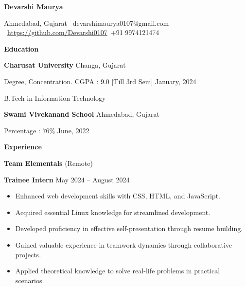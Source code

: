 \documentclass[11pt]{article}
\begin{document}
\begin{center}
    \textbf{Devarshi Maurya}\\ 
    \hrulefill
\end{center}

\begin{center}
    Ahmedabad, Gujarat \textbullet \ devarshimaurya0107@gmail.com \textbullet \  \url{https://github.com/Devarshi0107}\textbullet \ +91 9974121474
\end{center}

\vspace{0.5pt}

\begin{center}
    \textbf{Education}
\end{center}
\textbf{Charusat University} \hfill Changa, Gujarat

Degree, Concentration. CGPA : 9.0 [Till 3rd Sem] \hfill January, 2024

B.Tech in Information Technology

\vspace{12pt}

\textbf{Swami Vivekanand School} \hfill	Ahmedabad, Gujarat

Percentage : 76\%
\hfill June, 2022 

\vspace{12pt}

\begin{center}
    \textbf{Experience}
\end{center}
\textbf{Team Elementals} \hfill (Remote)

\textbf{Trainee Intern} \hfill May 2024 – August 2024
\begin{itemize}[noitemsep, topsep=0pt, partopsep=0pt, parsep=0pt]
   \item Enhanced web development skills with CSS, HTML, and JavaScript.
    \item Acquired essential Linux knowledge for streamlined development.
    \item Developed proficiency in effective self-presentation through resume building.
    \item Gained valuable experience in teamwork dynamics through collaborative projects.
    \item Applied theoretical knowledge to solve real-life problems in practical scenarios.
\end{itemize}

\vspace{12pt}
\end{document}
